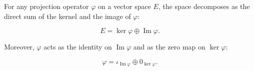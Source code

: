 For any projection operator $\varphi$ on a vector space $E$, the space decomposes as the direct sum of the kernel and the image of $\varphi$:

$$
E = \ker \varphi \oplus \operatorname{Im} \varphi.
$$

Moreover, $\varphi$ acts as the identity on $\operatorname{Im} \varphi$ and as the zero map on $\ker \varphi$:

$$
\varphi = \iota_{\operatorname{Im} \varphi} \oplus 0_{\ker \varphi}.
$$
